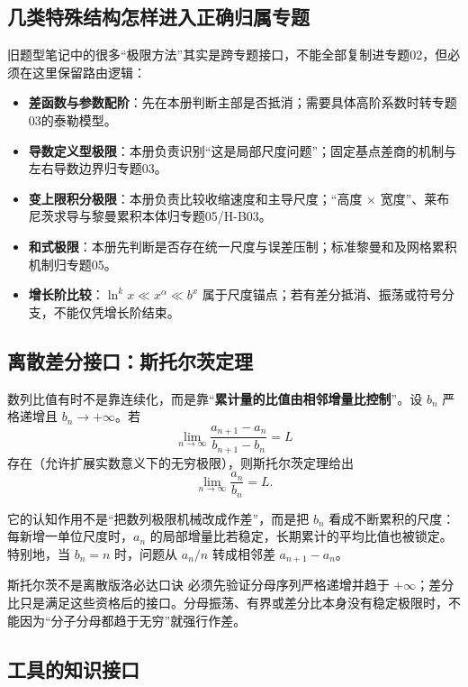 \documentclass[11pt,a4paper]{ctexart}
\newcommand{\kw}[1]{\textbf{\color{deep}#1}}
\begin{document}
\subsection{几类特殊结构怎样进入正确归属专题}

旧题型笔记中的很多“极限方法”其实是跨专题接口，不能全部复制进专题02，但必须在这里保留路由逻辑：
\begin{itemize}
  \item \kw{差函数与参数配阶}：先在本册判断主部是否抵消；需要具体高阶系数时转专题03的泰勒模型。
  \item \kw{导数定义型极限}：本册负责识别“这是局部尺度问题”；固定基点差商的机制与左右导数边界归专题03。
  \item \kw{变上限积分极限}：本册负责比较收缩速度和主导尺度；“高度 $\times$ 宽度”、莱布尼茨求导与黎曼累积本体归专题05/H-B03。
  \item \kw{和式极限}：本册先判断是否存在统一尺度与误差压制；标准黎曼和及网格累积机制归专题05。
  \item \kw{增长阶比较}：$\ln^k x\ll x^\alpha\ll b^x$ 属于尺度锚点；若有差分抵消、振荡或符号分支，不能仅凭增长阶结束。
\end{itemize}

\subsection{离散差分接口：斯托尔茨定理}

数列比值有时不是靠连续化，而是靠“\textbf{累计量的比值由相邻增量比控制}”。设 $b_n$ 严格递增且 $b_n\to+\infty$。若
\[
\lim_{n\to\infty}\frac{a_{n+1}-a_n}{b_{n+1}-b_n}=L
\]
存在（允许扩展实数意义下的无穷极限），则斯托尔茨定理给出
\[
\lim_{n\to\infty}\frac{a_n}{b_n}=L.
\]

它的认知作用不是“把数列极限机械改成作差”，而是把 $b_n$ 看成不断累积的尺度：每新增一单位尺度时，$a_n$ 的局部增量比若稳定，长期累计的平均比值也被锁定。特别地，当 $b_n=n$ 时，问题从 $a_n/n$ 转成相邻差 $a_{n+1}-a_n$。

\begin{warnbox}{斯托尔茨不是离散版洛必达口诀}
必须先验证分母序列严格递增并趋于 $+\infty$；差分比只是满足这些资格后的接口。分母振荡、有界或差分比本身没有稳定极限时，不能因为“分子分母都趋于无穷”就强行作差。
\end{warnbox}

\subsection{工具的知识接口}
\end{document}
